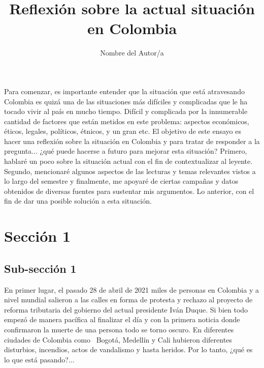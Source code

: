 \documentclass[doc, 12pt, letterpaper, donotrepeattitle, floatsintext, natbib]{apa7}
\title{\Large Reflexión sobre la actual situación en Colombia}
\author{Nombre del Autor/a}
\affiliation{Universidad de los Andes\\ Materia en Curso\\ Código: 123456789}
\begin{document}
\vspace*{-2cm}      %
\maketitle          %


\doublespacing %

Para comenzar, es importante entender que la situación que está atravesando Colombia es quizá una de las situaciones más difíciles y complicadas que le ha tocado vivir al país en mucho tiempo. Difícil y complicada por la innumerable cantidad de factores que están metidos en este problema: aspectos económicos, éticos, legales, políticos, étnicos, y un gran etc. El objetivo de este ensayo es hacer una reflexión sobre la situación en Colombia y para tratar de responder a la pregunta... ¿qué puede hacerse a futuro para mejorar esta situación? Primero, hablaré un poco sobre la situación actual con el fin de contextualizar al leyente. Segundo, mencionaré algunos aspectos de las lecturas y temas relevantes vistos a lo largo del semestre y finalmente, me apoyaré de ciertas campañas y datos obtenidos de diversas fuentes para sustentar mis argumentos. Lo anterior, con el fin de dar una posible solución a esta situación.
\noindent {}\\

\section{\large Sección 1}
\subsection{Sub-sección 1} 
En primer lugar, el pasado 28 de abril de 2021 miles de personas en Colombia y a nivel mundial salieron a las calles en forma de protesta y rechazo al proyecto de reforma tributaria del gobierno del actual presidente Iván Duque. Si bien todo empezó de manera pacífica al finalizar el día y con la primera noticia donde confirmaron la muerte de una persona todo se torno oscuro. En diferentes ciudades de Colombia como \ Bogotá, Medellín y Cali hubieron diferentes disturbios, incendios, actos de vandalismo y hasta heridos. Por lo tanto, ¿qué es lo que está pasando?...
\end{document}
